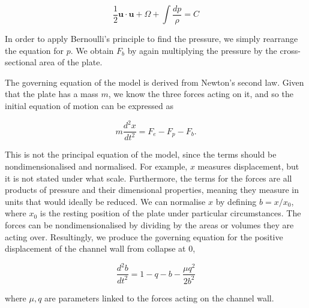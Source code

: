 \documentclass{article}
\begin{document}
\begin{equation}
    \frac{1}{2}\mathbf{u}\cdot\mathbf{u} + \Omega + \int\frac{dp}{\rho} = C
    \label{eqn:bernoulli}
\end{equation}

In order to apply Bernoulli's principle to find the pressure, we simply rearrange the equation for $p$.
We obtain $F_b$ by again multiplying the pressure by the cross-sectional area of the plate.


The governing equation of the model is derived from Newton's second law.
Given that the plate has a mass $m$, we know the three forces acting on it,
and so the initial equation of motion can be expressed as

\begin{equation}
    m\frac{d^2 x}{dt^2} = F_e - F_p - F_b.
    \label{eqn:model_init}
\end{equation}

This is not the principal equation of the model,
since the terms should be nondimensionalised and normalised.
For example, $x$ measures displacement,
but it is not stated under what scale.
Furthermore, the terms for the forces are all products of pressure and their dimensional properties,
meaning they measure in units that would ideally be reduced.
We can normalise $x$ by defining $b = x/x_0$, where $x_0$ is the resting position of the plate under particular circumstances. %
The forces can be nondimensionalised by dividing by the areas or volumes they are acting over.
Resultingly, we produce the governing equation for the positive displacement of the channel wall from collapse at $0$,

\begin{equation}
    \frac{d^2b}{dt^2} = 1 - q - b - \frac{\mu q^2}{2b^2}
    \label{eqn:master}
\end{equation}

where $\mu, q$ are parameters linked to the forces acting on the channel wall.

\end{document}
